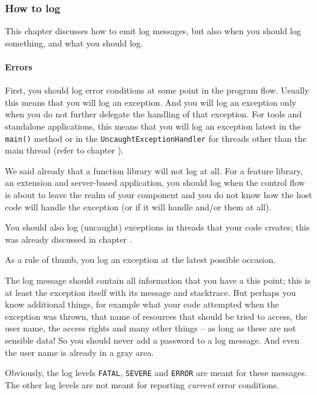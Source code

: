 
\subsubsection{How to log}\label{sec:HowToLog}
This chapter discusses how to emit log messages, but also when you should log something, and what you should log.

\paragraph{Errors} First, you should log error conditions at some point in the program flow. Usually this means that you will log an exception. And you will log an exception only when you do not further delegate the handling of that exception. For tools and standalone applications, this means that you will log an exception latest in the \lstinline|main()| method or in the \lstinline|UncaughtExceptionHandler| for threads other than the main thread (refer to chapter ).

We said already that a function library will not log at all. For a feature library, an extension and server-based application, you should log when the control flow is about to leave the realm of your component and you do not know how the host code will handle the exception (or if it will handle and/or them at all).

You should also log (uncaught) exceptions in threads that your code creates; this was already discussed in chapter .

As a rule of thumb, you log an exception at the latest possible occasion.

The log message should contain all information that you have a this point; this is at least the exception itself with its message and stacktrace. But perhaps you know additional things, for example what your code attempted when the exception was thrown, that name of resources that should be tried to access, the user name, the access rights and many other things – as long as these are not sensible data! So you should never add a password to a log message. And even the user name is already in a gray area.

Obviously, the log levels \verb#FATAL#, \verb#SEVERE# and \verb#ERROR# are meant for these messages. The other log levels are not meant for reporting \textit{current} error conditions.

